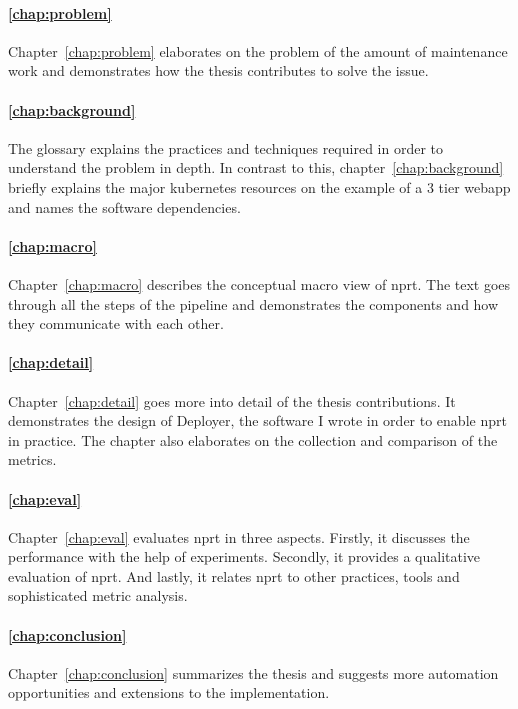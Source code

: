 \paragraph{\ref{chap:problem} }
Chapter~\ref{chap:problem} elaborates on the problem of the amount of maintenance work and
demonstrates how the thesis contributes to solve the issue.

\paragraph{\ref{chap:background} }
The glossary explains the practices and techniques required in order to understand the
problem in depth. In contrast to this, chapter~\ref{chap:background} briefly explains the
major kubernetes resources on the example of a 3 tier webapp and names the software
dependencies.

\paragraph{\ref{chap:macro} }
Chapter~\ref{chap:macro} describes the conceptual macro view of \gls{nprt}. The text goes
through all the steps of the pipeline and demonstrates the components and how they
communicate with each other.

\paragraph{\ref{chap:detail} }
Chapter~\ref{chap:detail} goes more into detail of the thesis contributions. It
demonstrates the design of Deployer, the software I wrote in order to enable \gls{nprt}
in practice. The chapter also elaborates on the collection and comparison of the metrics.

\paragraph{\ref{chap:eval} }
Chapter~\ref{chap:eval} evaluates \gls{nprt} in three aspects. Firstly, it discusses the
performance with the help of experiments. Secondly, it provides a qualitative evaluation
of \gls{nprt}. And lastly, it relates \gls{nprt} to other practices, tools and
sophisticated metric analysis.

\paragraph{\ref{chap:conclusion} }
Chapter~\ref{chap:conclusion} summarizes the thesis and suggests more automation
opportunities and extensions to the implementation.

